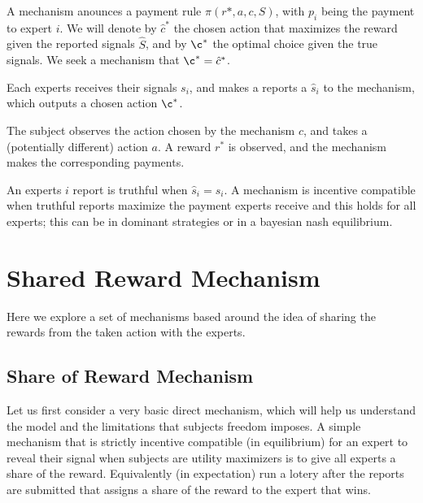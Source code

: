 A mechanism anounces a payment rule $\pi(r*,a,c,S)$, with $p_i$ being the payment to expert $i$. We will denote by $\hat{c}^{*}$ the chosen action that maximizes the reward given the reported signals $\hat{S}$, and by $\c^{*}$ the optimal choice given the true signals.
We seek a mechanism that  $\c^{*} = \hat{c}^{*}$.

Each experts receives their signals $s_i$, and makes a reports a $\hat{s}_i$ to the mechanism, which outputs a chosen action $\c^{*}$.

The subject observes the action chosen by the mechanism $c$, and takes a (potentially different) action $a$. A reward $r^{*}$ is observed, and the mechanism makes the corresponding payments.


%


An experts $i$ report is truthful when $\hat{s}_i=s_i$. A mechanism is incentive compatible when truthful reports maximize the payment experts receive and this holds for all experts; this can be in dominant strategies or in a bayesian nash equilibrium.

\section{Shared Reward Mechanism}

Here we explore a set of mechanisms based around the idea of sharing the rewards from the taken action with the experts.

\subsection{Share of Reward Mechanism}

Let us first consider a very basic direct mechanism, which will help us understand the model and the limitations that subjects freedom imposes. 
A simple mechanism that is strictly incentive compatible (in equilibrium) for an expert to reveal their signal when subjects are utility maximizers is to give all experts a share of the reward. Equivalently (in expectation) run a lotery after the reports are submitted that assigns a share of the reward to the expert that wins. 

